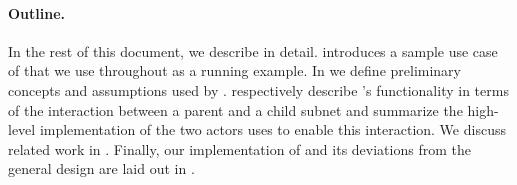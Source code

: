 

\paragraph{Outline.}
In the rest of this document, we describe \ipc in detail.
 introduces a sample use case of \ipc that we use throughout as a running example.
In  we define preliminary concepts and assumptions used by \ipc.
 respectively describe \ipc's functionality in terms of the interaction between a parent and a child subnet and summarize the high-level implementation of the two actors \ipc uses to enable this interaction.
We discuss related work in .
Finally, our implementation of \ipc and its deviations from the general design are laid out in .
